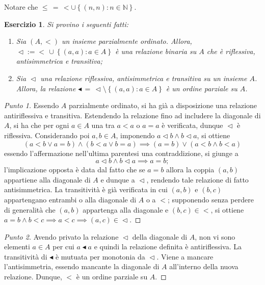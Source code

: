 \documentclass[fontsize = 11 pt, paper=A4, oneside, index=totoc, hyperref]{book}
\theoremstyle{definition}
\theoremstyle{plain}
\newtheorem{exe}{Esercizio}[section]
\newcommand{\N}{\mathbb{N}}
\newcommand{\order}{\vartriangleleft}
\begin{document}
Notare che \(\le\, =\, < \cup \left\lbrace (n,n) \colon n \in \N \right\rbrace\).

\begin{exe}
  Si provino i seguenti fatti:
  \begin{enumerate}
    \item Sia \((A, <)\) un insieme parzialmente ordinato. Allora, \(\order := <\,\cup \left\lbrace (a,a) \colon a \in A \right\rbrace\) è una relazione binaria su \(A\) che è riflessiva, antisimmetrica e transitiva;
    \item Sia \(\order\) una relazione riflessiva, antisimmetrica e transitiva su un insieme \(A\). Allora, la relazione \(\blacktriangleleft\, =\, \order \setminus \left\lbrace (a,a) \colon a \in A \right\rbrace\) è un ordine parziale su \(A\).
  \end{enumerate}
\end{exe}
\begin{proof}[Punto 1]
  Essendo \(A\) parzialmente ordinato, si ha già a disposizione una relazione antiriflessiva e transitiva. Estendendo la relazione fino ad includere la diagonale di \(A\), si ha che per ogni \(a \in A\) una tra \(a < a\) o \(a = a\) è verificata, dunque \(\order\) è riflessiva. Considerando poi \(a, b \in A\), imponendo \(a \order b \land b \order a\), si ottiene
  \[
  (a < b \lor a = b) \land (b < a \lor b = a) \implies (a = b) \lor (a < b \land b < a)
  \]
  essendo l'affermazione nell'ultima parentesi una contraddizione, si giunge a
  \[
  a \order b \land b \order a \implies a = b;
  \]
  l'implicazione opposta è data dal fatto che se \(a = b\) allora la coppia \((a,b)\) appartiene alla diagonale di \(A\) e dunque a \(\order\), rendendo tale relazione di fatto antisimmetrica. La transitività è già verificata in cui \((a,b)\) e \((b,c)\) appartengano entrambi o alla diagonale di \(A\) o a \(<\); supponendo senza perdere di generalità che \((a,b)\) appartenga alla diagonale e \((b,c) \in <\), si ottiene \(a = b \land b < c \implies a < c \implies (a,c) \in \order\).
\end{proof}
\begin{proof}[Punto 2]
Avendo privato la relazione \(\order\) della diagonale di \(A\), non vi sono elementi \(a \in A\) per cui \(a \blacktriangleleft a\) e quindi la relazione definita è antiriflessiva. La transitività di \(\blacktriangleleft\) è mutuata per monotonia da \(\order\). Viene a mancare l'antisimmetria, essendo mancante la diagonale di \(A\) all'interno della nuova relazione. Dunque, \(<\) è un ordine parziale su \(A\).
\end{proof}
\end{document}
